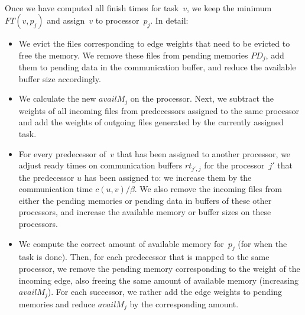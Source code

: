 \documentclass[conference]{IEEEtran}
\begin{document}
\medskip
{}\\
Once we have computed all finish times for task~$v$,
we keep the minimum $FT(v,p_j)$ and assign~$v$
to processor~$p_j$. 
In detail:
\begin{itemize}
\item 
  We evict the files corresponding to edge weights that need to be evicted to free the memory.
  We remove these files from pending memories
  $PD_j$, add them to pending data in the communication buffer, and reduce the available buffer size accordingly.
\item 
  We calculate the new $availM_j$ on the processor.
  Next, we subtract the weights of all incoming files from predecessors assigned to the same processor
  and add the weights of outgoing files generated by the currently assigned task.
  
\item  
  For every predecessor of~$v$ that has been assigned to another processor, we adjust ready times on
  communication buffers $rt_{j', j}$ for the processor~$j'$ that the predecessor $u$ has been assigned to: we increase them by the
  communication time $c( u,v) / \beta$.
  We also remove the incoming files from either the pending memories or pending data in buffers of these other
  processors, and increase the available memory or buffer sizes on these processors.
  
\item 
  We compute the correct amount of available memory for~$p_j$ (for when the task is done).
  Then, for each predecessor that is mapped to the same processor, 
  we remove the pending memory corresponding to the weight of
  the incoming edge, also freeing the same amount of available memory (increasing $availM_j$).
  For each successor, we rather add the edge weights to pending memories and reduce $availM_j$ 
  by the corresponding amount.
\end{itemize}
\end{document}
